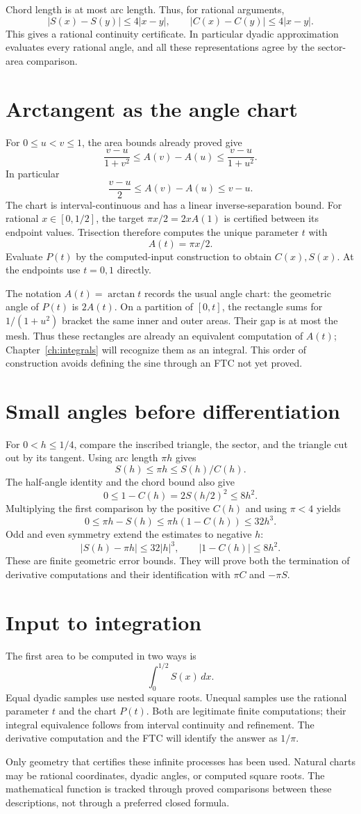 Chord length is at most arc length.  Thus, for rational arguments,
\[
 |S(x)-S(y)|\le4|x-y|,\qquad
 |C(x)-C(y)|\le4|x-y|.
\]
This gives a rational continuity certificate.  In particular dyadic
approximation evaluates every rational angle, and all these representations
agree by the sector-area comparison.

\section{Arctangent as the angle chart}
For $0\le u<v\le1$, the area bounds already proved give
\[
 \frac{v-u}{1+v^2}\le A(v)-A(u)
       \le\frac{v-u}{1+u^2}.
\]
In particular
\[
 \frac{v-u}{2}\le A(v)-A(u)\le v-u.
\]
The chart is interval-continuous and has a linear inverse-separation bound.
For rational $x\in[0,1/2]$, the target $\pi x/2=2xA(1)$ is certified
between its endpoint values.  Trisection therefore computes the unique
parameter $t$ with
\[
 A(t)=\pi x/2.
\]
Evaluate $P(t)$ by the computed-input construction to obtain $C(x),S(x)$.
At the endpoints use $t=0,1$ directly.

The notation $A(t)=\arctan t$ records the usual angle chart: the geometric
angle of $P(t)$ is $2A(t)$.  On a partition of $[0,t]$, the rectangle
sums for $1/(1+u^2)$ bracket the same inner and outer areas.  Their gap is
at most the mesh.  Thus these rectangles are already an equivalent
computation of $A(t)$; Chapter~\ref{ch:integrals} will recognize them as
an integral.  This order of construction avoids defining the sine through
an FTC not yet proved.

\section{Small angles before differentiation}
\label{sec:geometric-small-angle}
For $0<h\le1/4$, compare the inscribed triangle, the sector, and the
triangle cut out by its tangent.  Using arc length $\pi h$ gives
\[
 S(h)\le\pi h\le S(h)/C(h).
\]
The half-angle identity and the chord bound also give
\[
 0\le1-C(h)=2S(h/2)^2\le8h^2.
\]
Multiplying the first comparison by the positive $C(h)$ and using
$\pi<4$ yields
\[
 0\le\pi h-S(h)\le\pi h(1-C(h))\le32h^3.
\]
Odd and even symmetry extend the estimates to negative $h$:
\[
 |S(h)-\pi h|\le32|h|^3,\qquad |1-C(h)|\le8h^2.
\]
These are finite geometric error bounds.  They will prove both the
termination of derivative computations and their identification with
$\pi C$ and $-\pi S$.

\section{Input to integration}
The first area to be computed in two ways is
\[
 \int_0^{1/2}S(x)\,dx.
\]
Equal dyadic samples use nested square roots.  Unequal samples use the
rational parameter $t$ and the chart $P(t)$.  Both are legitimate finite
computations; their integral equivalence follows from interval continuity
and refinement.  The derivative computation and the FTC will identify the
answer as $1/\pi$.

Only geometry that certifies these infinite processes has been used.
Natural charts may be rational coordinates, dyadic angles, or computed
square roots.  The mathematical function is tracked through proved
comparisons between these descriptions, not through a preferred closed
formula.
